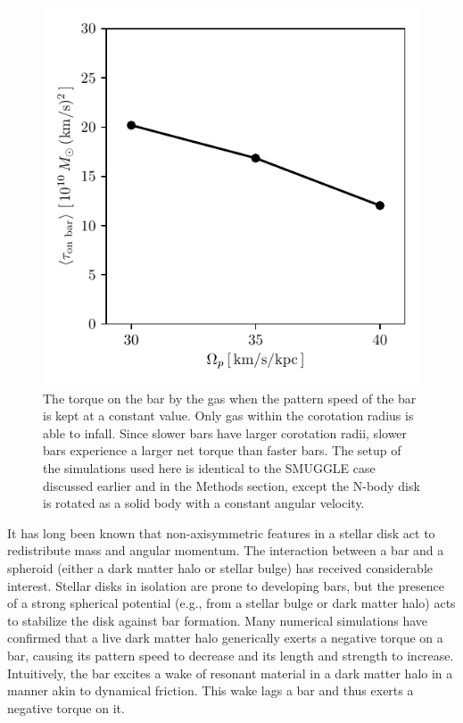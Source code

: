 \documentclass{natureprintstyle}
\begin{document}
\begin{figure}[h!]
\centering
\includegraphics{fig/fig4.pdf}
\caption{The torque on the bar by the gas when the pattern speed of the bar is
kept at a constant value. Only gas within the corotation radius is able to
infall. Since slower bars have larger corotation radii, slower bars experience
a larger net torque than faster bars. The setup of the simulations used here
is identical to the SMUGGLE case discussed earlier and in the Methods section,
except the N-body disk is rotated as a solid body with a constant angular
velocity.}\label{fig:equil}
\end{figure}


It has long been known that non-axisymmetric features in a stellar disk act to
redistribute mass and angular momentum.\cite{1972MNRAS.157....1L} The
interaction between a bar and a spheroid (either a dark matter halo or stellar
bulge) has received considerable interest.\cite{1984MNRAS.209..729T,
1985MNRAS.213..451W} Stellar disks in isolation are prone to developing bars,
\cite{1971ApJ...168..343H} but the presence of a strong spherical potential
(e.g., from a stellar bulge or dark matter halo) acts to stabilize the disk
against bar formation.\cite{1973ApJ...186..467O, 1976AJ.....81...30H} Many
numerical simulations have confirmed that a live dark matter halo generically
exerts a negative torque on a bar, causing its pattern speed to decrease and
its length and strength to increase\cite{1992ApJ...400...80H,
2000ApJ...543..704D, 2002MNRAS.330...35A, 2002ApJ...569L..83A,
2003MNRAS.341.1179A, 2003MNRAS.346..251O, 2005MNRAS.363..991H,
2006ApJ...637..214M, 2007MNRAS.375..460W, 2009ApJ...697..293D}. Intuitively,
the bar excites a wake of resonant material in a dark matter halo in a manner
akin to dynamical friction. This wake lags a bar and thus exerts a negative
torque on it.
\end{document}
